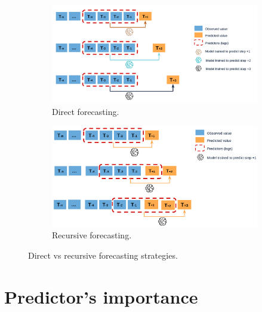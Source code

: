 \begin{figure}[H]
\centering
    \begin{subfigure}{.45\textwidth}
        \centering
        \includegraphics[width=1\linewidth]{images/methodology/direct-multi-step-forecasting}
        \caption{Direct forecasting.}
    \end{subfigure}
    \begin{subfigure}{.45\textwidth}
        \centering
        \includegraphics[width=1\linewidth]{images/methodology/recursive-mutistep-forecasting}
        \caption{Recursive forecasting.}
    \end{subfigure}

    \caption{Direct vs recursive forecasting strategies.}
    \label{fig:direct-recursive-forecasting}
\end{figure}

\section{Predictor's importance}


